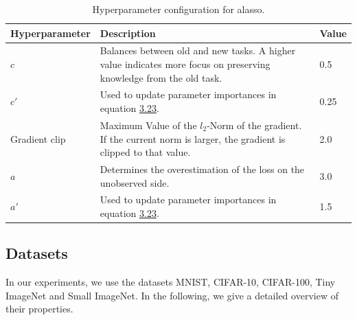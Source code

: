 \begin{table}[!htb]
    \centering
    \begin{tabularx}{\textwidth}{| l | X | l |} 
        \hline
        Hyperparameter & Description & Value \\ 
        \hline 
        \hline
        $c$ & Balances between old and new tasks. A higher value indicates more focus
        on preserving knowledge from the old task. & 0.5  \\ 
        \hline
        $c'$ & Used to update parameter importances in equation \hyperref[eq:ALASSO_Small_Omega]{3.23}. & 0.25  \\
        \hline
        Gradient clip & Maximum Value of the $l_2$-Norm of the gradient. If the current norm is larger, the
        gradient is clipped to that value. & 2.0 \\ 
        \hline
        $a$ & Determines the overestimation of the loss on the unobserved side. & 3.0 \\
        \hline
        $a'$ & Used to update parameter importances in equation \hyperref[eq:ALASSO_Small_Omega]{3.23}. & 1.5 \\
        \hline
    \end{tabularx}
    \caption{Hyperparameter configuration for \gls{alasso}.}
    \label{fig:AlassoParams}
\end{table}

\clearpage

\subsection{Datasets}
\label{sec:Appendix:Datasets}
In our experiments, we use the datasets MNIST, CIFAR-10, CIFAR-100, Tiny ImageNet and Small ImageNet. In the following, we give a detailed overview of their properties.

